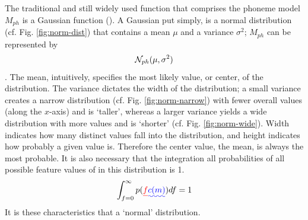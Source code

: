 The traditional and still widely used function that comprises the phoneme model $M_{ph}$ is a Gaussian function (\cite{gales:07}).  A Gaussian put simply, is a normal distribution (cf. Fig. \ref{fig:norm-dist}) that contains a mean $\mu$ and a variance $\sigma^2$; $M_{ph}$ can be represented by \DIFaddbegin {}\DIFaddend \begin{equation} \mathcal{N}_{ph}(\mu,\sigma^2) \end{equation}%
\DIFdelend . \DIFaddbegin  \DIFaddend The mean, intuitively, specifies the most likely value, or center, of the distribution.  The variance dictates the width of the distribution; a small variance creates a narrow distribution (cf. Fig. \ref{fig:norm-narrow}) with fewer overall values (along the $x$-axis) and is `taller', whereas a larger variance yields a wide distribution with more values and is `shorter' (cf. Fig. \ref{fig:norm-wide}).  Width indicates how many distinct values fall into the distribution, and height indicates how probably a given value is.  Therefore the center value, the mean, is always the most probable.  It is also necessary that the integration \DIFaddbegin {}\DIFaddend all probabilities of all possible feature values of \DIFdelbegin {}\DIFdelend \DIFaddbegin {}\DIFaddend in this distribution is 1. \begin{equation} \int_{f=0}^\infty p(\DIFdelbegin \DIFdel{f}\DIFdelend \DIFaddbegin \DIFadd{c(m)}\DIFaddend ) df = 1 \end{equation}  It is these characteristics that \DIFdelbegin {}\DIFdelend \DIFaddbegin {}\DIFaddend a `normal' distribution.  
%
\DIFdelbegin %
